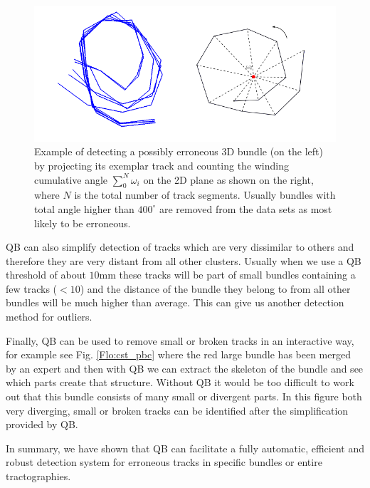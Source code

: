 \documentclass[preprint,authoryear,a4paper,10pt,onecolumn]{elsarticle}
\begin{document}
\begin{figure}
\begin{centering}
\includegraphics[scale=0.5]{last_figures/winding}
\par\end{centering}
\caption{Example of detecting a possibly erroneous 3D bundle (on the
  left) by projecting its exemplar track and counting the winding
  cumulative angle $\sum_{0}^{N}\omega_{i}$ on the 2D plane as shown on
  the right, where $N$ is the total number of track segments. Usually
  bundles with total angle higher than $400^{\circ}$ are removed from
  the data sets as most likely to be erroneous.\label{Flo:winding}}
\end{figure}

QB can also simplify detection of tracks which are very dissimilar to
others and therefore they are very distant from all other clusters.
Usually when we use a QB threshold of about $10$mm these tracks will be
part of small bundles containing a few tracks ($<10$) and the distance
of the bundle they belong to from all other bundles will be much higher
than average. This can give us another detection method for outliers.

Finally, QB can be used to remove small or broken tracks in an
interactive way, for example see Fig. \ref{Flo:cst_pbc} where the red
large bundle has been merged by an expert and then with QB we can
extract the skeleton of the bundle and see which parts create that
structure. Without QB it would be too difficult to work out that this
bundle consists of many small or divergent parts. In this figure both
very diverging, small or broken tracks can be identified after the
simplification provided by QB.

In summary, we have shown that QB can facilitate a fully automatic,
efficient and robust detection system for erroneous tracks in specific
bundles or entire tractographies.
\end{document}

